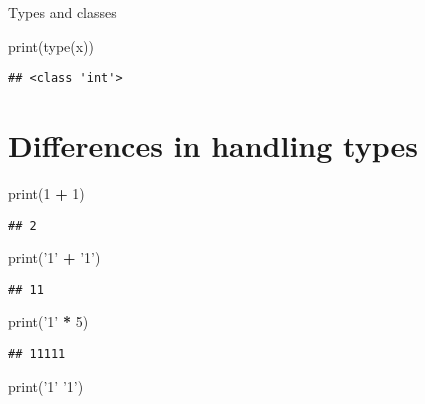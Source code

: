 \documentclass[]{book}
\newenvironment{Shaded}{\begin{snugshade}}{\end{snugshade}}
\newcommand{\BuiltInTok}[1]{#1}
\newcommand{\DecValTok}[1]{\textcolor[rgb]{0.00,0.00,0.81}{#1}}
\newcommand{\NormalTok}[1]{#1}
\newcommand{\OperatorTok}[1]{\textcolor[rgb]{0.81,0.36,0.00}{\textbf{#1}}}
\newcommand{\StringTok}[1]{\textcolor[rgb]{0.31,0.60,0.02}{#1}}
\theoremstyle{definition}
\theoremstyle{definition}
\theoremstyle{definition}
\theoremstyle{remark}
\begin{document}
Types and classes

\begin{Shaded}
\begin{Highlighting}[]
\BuiltInTok{print}\NormalTok{(}\BuiltInTok{type}\NormalTok{(x))}
\end{Highlighting}
\end{Shaded}

\begin{verbatim}
## <class 'int'>
\end{verbatim}

\hypertarget{differences-in-handling-types}{%
\chapter{Differences in handling
types}\label{differences-in-handling-types}}

\begin{Shaded}
\begin{Highlighting}[]
\BuiltInTok{print}\NormalTok{(}\DecValTok{1} \OperatorTok{+} \DecValTok{1}\NormalTok{)}
\end{Highlighting}
\end{Shaded}

\begin{verbatim}
## 2
\end{verbatim}

\begin{Shaded}
\begin{Highlighting}[]
\BuiltInTok{print}\NormalTok{(}\StringTok{'1'} \OperatorTok{+} \StringTok{'1'}\NormalTok{)}
\end{Highlighting}
\end{Shaded}

\begin{verbatim}
## 11
\end{verbatim}

\begin{Shaded}
\begin{Highlighting}[]
\BuiltInTok{print}\NormalTok{(}\StringTok{'1'} \OperatorTok{*} \DecValTok{5}\NormalTok{)}
\end{Highlighting}
\end{Shaded}

\begin{verbatim}
## 11111
\end{verbatim}

\begin{Shaded}
\begin{Highlighting}[]
\BuiltInTok{print}\NormalTok{(}\StringTok{'1'} \StringTok{'1'}\NormalTok{)}
\end{Highlighting}
\end{Shaded}
\end{document}
